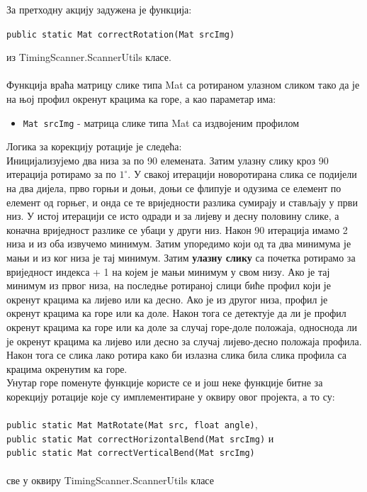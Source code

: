 \documentclass[12pt]{article}
\begin{document}
\vspace{0.5cm}
За претходну акцију задужена је функција:
\begin{center}
\texttt{public static Mat correctRotation(Mat srcImg)}
\end{center}
из TimingScanner.ScannerUtils класе.\\\\
Функција враћа матрицу слике типа Mat са ротираном улазном сликом тако да је на њој профил окренут крацима ка горе, а као параметар има:
\begin{itemize}
    \item \texttt{Mat srcImg} - матрица слике типа Mat са издвојеним профилом
\end{itemize}
Логика за корекцију ротације је следећа:\\
Иницијализујемо два низа за по 90 елемената. Затим улазну слику кроз 90 итерација ротирамо за по $1^\circ$. У свакој итерацији новоротирана слика се подијели на два дијела, прво горњи и доњи, доњи се флипује и одузима се елемент по елемент од горњег, и онда се те вриједности разлика сумирају и стављају у први низ. У истој итерацији се исто одради и за лијеву и десну половину слике, а коначна вриједност разлике се убаци у други низ. Након 90 итерација имамо 2 низа и из оба извучемо минимум. Затим упоредимо који од та два минимума је мањи и из ког низа је тај минимум. Затим \textbf{улазну слику} са почетка ротирамо за вриједност индекса + 1 на којем је мањи минимум у свом низу. Ако је тај минимум из првог низа, на последње ротираној слици биће профил који је окренут крацима ка лијево или ка десно. Ако је из другог низа, профил је окренут крацима ка горе или ка доле. Након тога се детектује да ли је профил окренут крацима ка горе или ка доле за случај горе-доле положаја, односнода ли је окренут крацима ка лијево или десно за случај лијево-десно положаја профила. Након тога се слика лако ротира како би излазна слика била слика профила са крацима окренутим ка горе.\\
Унутар горе поменуте функције користе се и још неке функције битне за корекцију ротације које су имплементиране у оквиру овог пројекта, а то су:\\\\
\texttt{public static Mat MatRotate(Mat src, float angle)},\\
\texttt{public static Mat correctHorizontalBend(Mat srcImg)} и \\
\texttt{public static Mat correctVerticalBend(Mat srcImg)}\\\\
све у оквиру TimingScanner.ScannerUtils класе
\end{document}
